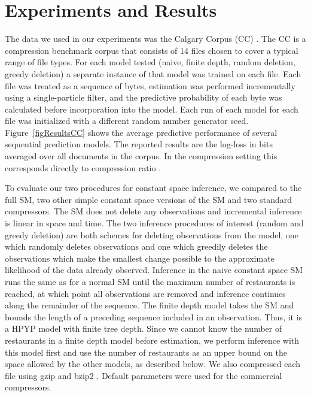 \section{Experiments and Results}
\label{results}

The data we used in our experiments was the Calgary Corpus (CC) \cite{Bell1989}.  The CC is a compression benchmark corpus that consists of 14 files chosen to cover a typical range of file types.  For each model tested (naive, finite depth, random deletion, greedy deletion) a separate instance of that model was trained on each file.  Each file was treated as a sequence of bytes, estimation was performed incrementally using a single-particle filter, and the predictive probability of each byte was calculated before incorporation into the model.  Each run of each model for each file was initialized with a different random number generator seed.  Figure~\ref{figResultsCC} shows the average predictive performance of several sequential prediction models.  The reported results are the log-loss in bits averaged over all documents in the corpus.  In the compression setting this corresponds directly to compression ratio \cite{Cover1991}.


To evaluate our two procedures for constant space inference, we compared to the full SM, two other simple constant space versions of the SM and two standard compressors.  The SM does not delete any observations and incremental inference is linear in space and time.  The two inference procedures of interest (random and greedy deletion) are both schemes for deleting observations from the model, one which randomly deletes observations and one which greedily deletes the observations which make the smallest change possible to the approximate likelihood of the data already observed.  Inference in the naive constant space SM runs the same as for a normal SM until the maximum number of restaurants is reached, at which point all observations are removed and inference continues along the remainder of the sequence.  The finite depth model takes the SM and bounds the length of a preceding sequence included in an observation.  Thus, it is a HPYP model with finite tree depth.  Since we cannot know the number of restaurants in a finite depth model before estimation, we perform inference with this model first and use the number of restaurants as an upper bound on the space allowed by the other models, as described below.  We also compressed each file using gzip and bzip2 \cite{Deutsch1996, Seward1999}.  Default parameters were used for the commercial compressors.

